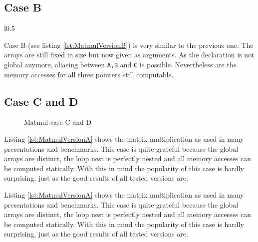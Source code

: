 \subsection{Case B}
\begin{wrapfigure}[]{l}{0.5\textwidth}
    \begin{minipage}[c]{0.4\textwidth}
    \vspace*{-3mm}
    
    \end{minipage}
    \caption{Matmul case B}
    \label{lst:MatmulVersionB}
\end{wrapfigure}

Case B (see listing \ref{lst:MatmulVersionB}) is very similar to the previous one.
The arrays are still fixed in size but now given as arguments. As the declaration 
is not global anymore, aliasing between \texttt{A,B} and \texttt{C} is possible. 
Nevertheless are the memory accesses for all three pointers still computable.
\\


\subsection{Case C and D}
\begin{figure}[htpb]
  \centering
  \caption{Matmul case C and D}
   \label{lst:MatmulVersionCD}
\end{figure}
Listing \ref{lst:MatmulVersionA} shows the matrix multiplication as used in 
many presentations and benchmarks. This case is quite grateful because the
global arrays are distinct, the loop nest is perfectly nested and all 
memory accesses can be computed statically. With this in mind the popularity of
this case is hardly surprising, just as the good results of all tested versions 
are. 


Listing \ref{lst:MatmulVersionA} shows the matrix multiplication as used in 
many presentations and benchmarks. This case is quite grateful because the
global arrays are distinct, the loop nest is perfectly nested and all 
memory accesses can be computed statically. With this in mind the popularity of
this case is hardly surprising, just as the good results of all tested versions 
are. 

